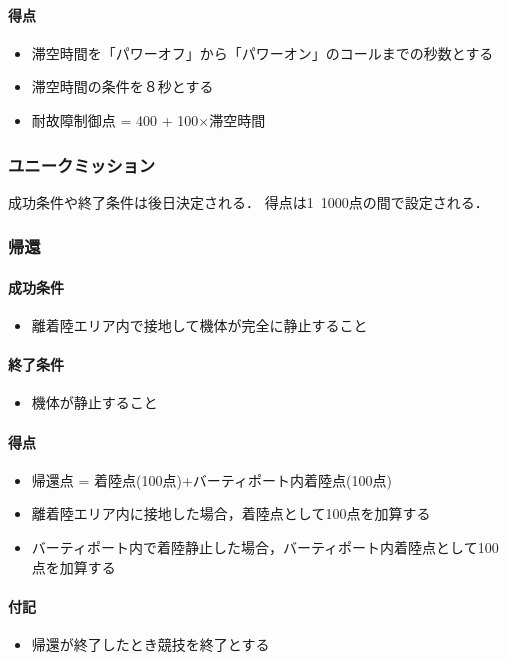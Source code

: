 \paragraph{得点}
\begin{itemize}
  \item 滞空時間を「パワーオフ」から「パワーオン」のコールまでの秒数とする
  \item 滞空時間の条件を８秒とする
  \item 耐故障制御点 = 400 + 100$\times$滞空時間
\end{itemize}

\subsubsection{ユニークミッション}
成功条件や終了条件は後日決定される．
得点は1~1000点の間で設定される．

\subsubsection{帰還}
\paragraph{成功条件}
\begin{itemize}
\item 離着陸エリア内で接地して機体が完全に静止すること
\end{itemize}
\paragraph{終了条件}
\begin{itemize}
\item 機体が静止すること
\end{itemize}
\paragraph{得点}
\begin{itemize}
\item 帰還点 = 着陸点(100点)+バーティポート内着陸点(100点)
\item 離着陸エリア内に接地した場合，着陸点として100点を加算する
\item バーティポート内で着陸静止した場合，バーティポート内着陸点として100点を加算する
\end{itemize}
\paragraph{付記}
\begin{itemize}
\item 帰還が終了したとき競技を終了とする
\end{itemize}


